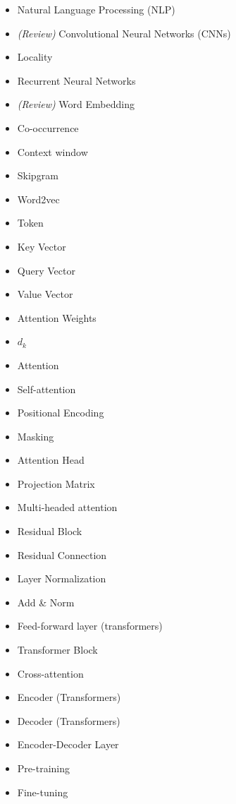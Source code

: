     \begin{itemize}
        \item Natural Language Processing (NLP)
        \item \textit{(Review)} Convolutional Neural Networks (CNNs)
        \item Locality
        \item Recurrent Neural Networks
        \item \textit{(Review)} Word Embedding
        \item Co-occurrence
        \item Context window
        \item Skipgram
        \item Word2vec
        \item Token
        \item Key Vector
        \item Query Vector
        \item Value Vector
        \item Attention Weights
        \item $d_k$
        \item Attention
        \item Self-attention
        \item Positional Encoding
        \item Masking
        \item Attention Head
        \item Projection Matrix
        \item Multi-headed attention
        \item Residual Block
        \item Residual Connection
        \item Layer Normalization
        \item Add \& Norm
        \item Feed-forward layer (transformers)
        \item Transformer Block
        \item Cross-attention
        \item Encoder (Transformers)
        \item Decoder (Transformers)
        \item Encoder-Decoder Layer
        \item Pre-training
        \item Fine-tuning
    \end{itemize}



        

        

    

    
        

